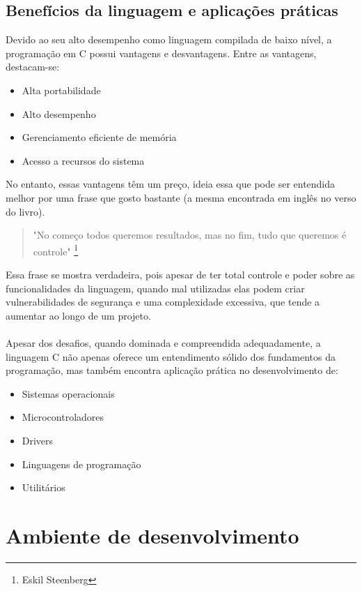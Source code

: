\documentclass{book}
\begin{document}
\subsection{Benefícios da linguagem e aplicações práticas}

Devido ao seu alto desempenho como linguagem compilada de baixo 
nível, a programação em C possui vantagens e desvantagens. Entre 
as vantagens, destacam-se:

\begin{itemize}
\item Alta portabilidade
\item Alto desempenho
\item Gerenciamento eficiente de memória
\item Acesso a recursos do sistema
\end{itemize}

No entanto, essas vantagens têm um preço, ideia essa que pode ser 
entendida melhor por uma frase que gosto bastante (a mesma encontrada 
em inglês no verso do livro).

\begin{quote}
    "No começo todos queremos resultados, mas no fim, tudo que queremos é controle"
    \footnote{Eskil Steenberg}
\end{quote}

Essa frase se mostra verdadeira, pois apesar de ter total controle 
e poder sobre as funcionalidades da linguagem, quando mal utilizadas 
elas podem criar vulnerabilidades de segurança e uma complexidade 
excessiva, que tende a aumentar ao longo de um projeto.
\\\\
Apesar dos desafios, quando dominada e compreendida adequadamente, 
a linguagem C não apenas oferece um entendimento sólido dos fundamentos 
da programação, mas também encontra aplicação prática no desenvolvimento de:

\begin{itemize}
\item Sistemas operacionais
\item Microcontroladores
\item Drivers
\item Linguagens de programação
\item Utilitários
\end{itemize}

\section{Ambiente de desenvolvimento}
\end{document}
